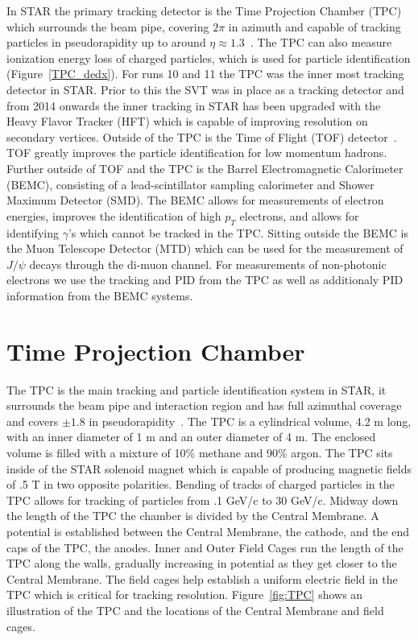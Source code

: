 In STAR the primary tracking detector is the Time Projection Chamber (TPC) which surrounds the beam pipe, covering $2\pi$ in azimuth and capable of tracking particles in pseudorapidity up to around $\eta \approx 1.3$~\cite{tpcNIM}. The TPC can also measure ionization energy loss of charged particles, which is used for particle identification (Figure~\ref{TPC_dedx}). For runs 10 and 11 the TPC was the inner most tracking detector in STAR. Prior to this the SVT was in place as a tracking detector and from 2014 onwards the inner tracking in STAR has been upgraded with the Heavy Flavor Tracker (HFT) which is capable of improving resolution on secondary vertices. Outside of the TPC is the Time of Flight (TOF) detector~\cite{vpdNIM}. TOF greatly improves the particle identification for low momentum hadrons. Further outside of TOF and the TPC is the Barrel Electromagnetic Calorimeter (BEMC), consisting of a lead-scintillator sampling calorimeter and Shower Maximum Detector (SMD). The BEMC allows for measurements of electron energies, improves the identification of high $p_T$ electrons, and allows for identifying $\gamma$'s which cannot be tracked in the TPC. Sitting outside the BEMC is the Muon Telescope Detector (MTD) which can be used for the measurement of $J/\psi$ decays through the di-muon channel. For measurements of non-photonic electrons we use the tracking and PID from the TPC as well as additionaly PID information from the BEMC systems.

\section{Time Projection Chamber}

The TPC is the main tracking and particle identification system in STAR, it surrounds the beam pipe and interaction region and has full azimuthal coverage and covers $\pm 1.8$ in pseudorapidity~\cite{tpcNIM}. The TPC is a cylindrical volume, 4.2 m long, with an inner diameter of 1 m and an outer diameter of 4 m. The enclosed volume is filled with a mixture of 10\% methane and 90\% argon. The TPC sits inside of the STAR solenoid magnet which is capable of producing magnetic fields of .5 T in two opposite polarities. Bending of tracks of charged particles in the TPC allows for tracking of particles from .1 GeV/c to 30 GeV/c. Midway down the length of the TPC the chamber is divided by the Central Membrane. A potential is established between the Central Membrane, the cathode, and the end caps of the TPC, the anodes. Inner and Outer Field Cages run the length of the TPC along the walls, gradually increasing in potential as they get closer to the Central Membrane. The field cages help establish a uniform electric field in the TPC which is critical for tracking resolution. Figure~\ref{fig:TPC} shows an illustration of the TPC and the locations of the Central Membrane and field cages.

